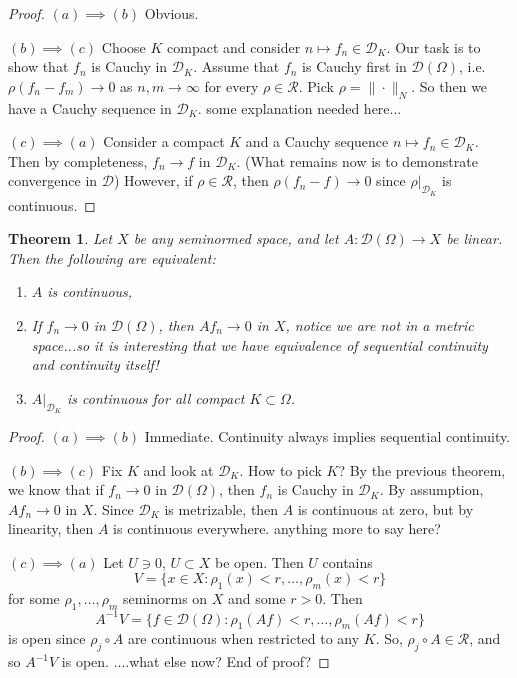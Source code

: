 \documentclass[letterpaper,twoside,11pt]{article}
\theoremstyle{mystyle}
\newtheorem{theorem}{Theorem}[section]
\newcommand{\cg}{\color{gray}}
\newcommand{\cbk}{\color{black}}
\newcommand{\cred}{\color{red}}
\begin{document}
\begin{proof}
  $(a) \implies (b)$ Obvious. 

  $(b) \implies (c)$ Choose $K$ compact and consider $n \mapsto f_n \in \mathcal D_K$. Our task is to show that $f_n$ is Cauchy in $\mathcal D_K$. Assume that $f_n$ is Cauchy first in $\mathcal D(\Omega)$, i.e. $\rho(f_n - f_m) \to 0$ as $n, m\to \infty$ for every $\rho \in \mathcal R$. Pick $\rho = \|\cdot\|_N$. So then we have a Cauchy sequence in $\mathcal D_K$. \cred some explanation needed here...\cbk 

  $(c) \implies (a)$ Consider a compact $K$ and a Cauchy sequence $n\mapsto f_n \in \mathcal D_K$. Then by completeness, $f_n \to f$ in $\mathcal D_K$. (What remains now is to demonstrate convergence in $\mathcal D$) However, if $\rho \in \mathcal R$, then $\rho(f_n -f) \to 0$ since $\rho|_{\mathcal D_K}$ is continuous. 
\end{proof}


\begin{tcolorbox}[colback=red!5!white,colframe=red!75!black]
\begin{theorem}
Let $X$ be any seminormed space, and let $A: \mathcal D(\Omega) \to X$ be linear. Then the following are equivalent: 
\begin{enumerate}[label=(\alph*)]
  \item $A$ is continuous, 
  \item If $f_n \to 0$ in $\mathcal D(\Omega)$, then $Af_n \to 0$ in $X$, \cg notice we are not in a metric space...so it is interesting that we have equivalence of sequential continuity and continuity itself!\cbk 
  \item $A|_{\mathcal D_K}$ is continuous for all compact $K\subset \Omega$. 
\end{enumerate}
\end{theorem}
\end{tcolorbox}

\begin{proof}
  $(a) \implies (b)$ Immediate. Continuity always implies sequential continuity.

  $(b) \implies (c)$ Fix $K$ and look at $\mathcal D_K$. How to pick $K$? By the previous theorem, we know that if $f_n \to 0$ in $\mathcal D(\Omega)$, then $f_n$ is Cauchy in $\mathcal D_K$. By assumption, $Af_n \to 0$ in $X$. Since $\mathcal D_K $ is metrizable, then $A$ is continuous at zero, but by linearity, then $A$ is continuous everywhere. \cred anything more to say here? \cbk 

  $(c) \implies (a)$ Let $U\ni 0$, $U\subset X$ be open. Then $U$ contains 
  \[V = \{x\in X : \rho_1(x) < r, \dots, \rho_m(x) < r\}\]
  for some $\rho_1, \dots, \rho_m$ seminorms on $X$ and some $r>0$. Then 
  \[A^{-1} V = \{f\in \mathcal D(\Omega) : \rho_1(Af) <r, \dots, \rho_m(Af)<r \}\]
  is open since $\rho_j\circ A$ are continuous when restricted to any $K$. So, $\rho_j \circ A \in \mathcal R$, and so $A^{-1}V$ is open. ....\cred what else now? End of proof? \cbk 

\end{proof}
\end{document}
